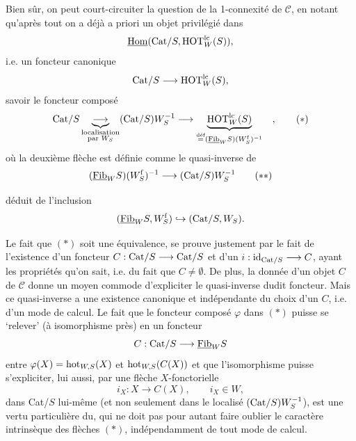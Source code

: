 Bien sûr, on peut court-circuiter la question de la 1-connexité de $\mathcal{C}$, en notant qu'après tout on a déjà a priori un objet privilégié dans
\[
\underline{\mathrm{Hom}}(\mathrm{Cat}/S, \mathrm{HOT}^{\mathrm{lc}}_W(S)),
\]
i.e. un foncteur canonique
\[
\mathrm{Cat}/S \longrightarrow \mathrm{HOT}^{\mathrm{lc}}_W(S),
\]
savoir le foncteur composé
\[
\mathrm{Cat}/S \underbrace{\longrightarrow}_{\substack{\text{localisation}\\ \text{par } W_S}} (\mathrm{Cat}/S)W_S^{-1} \longrightarrow \underbrace{\mathrm{HOT}^{\mathrm{lc}}_W(S)}_{\overset{\text{déf}}{=} (\underline{\mathrm{Fib}}_W S)(W^{\mathrm{f}}_S)^{-1}} \quad ,
\tag*{$(*)$}
\]
où la deuxième flèche est définie comme le quasi-inverse de
\[
(\underline{\mathrm{Fib}}_W S)(W^{\mathrm{f}}_S)^{-1} \longrightarrow (\mathrm{Cat}/S)W_S^{-1}
\tag*{$(**)$}
\]

déduit de l'inclusion
\[
(\underline{\mathrm{Fib}}_W S, W^{\mathrm{f}}_S) \hookrightarrow (\mathrm{Cat}/S, W_S).
\]

Le fait que $(*)$ soit une équivalence, se prouve justement par le fait de l'existence d'un foncteur $C : \mathrm{Cat}/S \longrightarrow \mathrm{Cat}/S$ et d'un $i : \mathrm{id}_{\mathrm{Cat}/S} \longrightarrow C$, ayant les propriétés qu'on sait, i.e. du fait que $C \neq \emptyset$. De plus, la donnée d'un objet $C$ de $\mathcal{C}$ donne un moyen commode d'expliciter le quasi-inverse dudit foncteur. Mais ce quasi-inverse a une existence canonique et indépendante du choix d'un $C$, i.e. d'un mode de calcul. Le fait que le foncteur composé $\varphi$ dans $(*)$ puisse se ‘relever’ (à isomorphisme près) en un foncteur %
\[
C : \mathrm{Cat}/S \longrightarrow \underline{\mathrm{Fib}}_W S
\]
entre $\varphi(X) = \mathrm{hot}_{W,S}(X)$ et $\mathrm{hot}_{W,S}(C(X))$ et que l'isomorphisme puisse s'expliciter, lui aussi, par une flèche $X$-fonctorielle
\[
i_X : X \longrightarrow C(X), \qquad i_X \in W,
\]
dans Cat/$S$ lui-même (et non seulement dans le localisé $(\mathrm{Cat}/S)W_S^{-1}$),
est une vertu particulière du, qui ne doit pas pour autant faire oublier le caractère intrinsèque des flèches $(*)$, indépendamment de tout mode de calcul.

